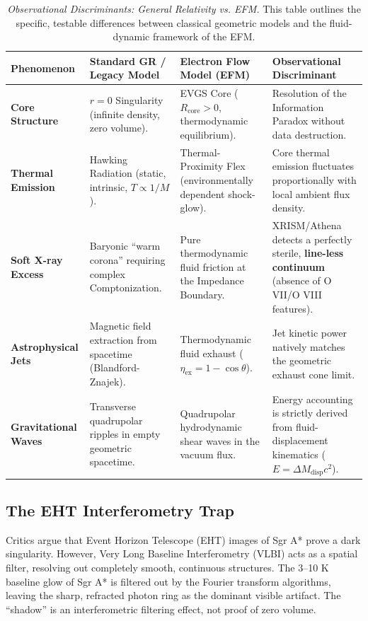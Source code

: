 \documentclass[11pt, a4paper]{article}
\begin{document}
\clearpage
\begin{table}[!ht]
  \centering
  \renewcommand{\arraystretch}{1.3}
  \begin{tabular}{@{} p{} p{} p{} p{} @{}}
    \toprule
    \textbf{Phenomenon} & \textbf{Standard GR / Legacy Model} & \textbf{Electron Flow Model (EFM)} & \textbf{Observational Discriminant} \\
    \midrule
    \textbf{Core Structure} & $r=0$ Singularity (infinite density, zero volume). & EVGS Core ($R_{\text{core}} > 0$, thermodynamic equilibrium). & Resolution of the Information Paradox without data destruction. \\
    \textbf{Thermal Emission} & Hawking Radiation (static, intrinsic, $T \propto 1/M$). & Thermal-Proximity Flex (environmentally dependent shock-glow). & Core thermal emission fluctuates proportionally with local ambient flux density. \\
    \textbf{Soft X-ray Excess} & Baryonic ``warm corona'' requiring complex Comptonization. & Pure thermodynamic fluid friction at the Impedance Boundary. & XRISM/Athena detects a perfectly sterile, \textbf{line-less continuum} (absence of O VII/O VIII features). \\
    \textbf{Astrophysical Jets} & Magnetic field extraction from spacetime (Blandford-Znajek). & Thermodynamic fluid exhaust ($\eta_{\text{ex}} = 1 - \cos\theta$). & Jet kinetic power natively matches the geometric exhaust cone limit. \\
    \textbf{Gravitational Waves} & Transverse quadrupolar ripples in empty geometric spacetime. & Quadrupolar hydrodynamic shear waves in the vacuum flux. & Energy accounting is strictly derived from fluid-displacement kinematics ($E = \Delta M_{\text{disp}} c^2$). \\
    \bottomrule
  \end{tabular}
  \caption{\textit{Observational Discriminants: General Relativity vs. EFM.} This table outlines the specific, testable differences between classical geometric models and the fluid-dynamic framework of the EFM.}
  \label{tab:predictions}
\end{table}

\subsection{The EHT Interferometry Trap}
Critics argue that Event Horizon Telescope (EHT) images of Sgr A* \cite{eht2019} prove a dark singularity. However, Very Long Baseline Interferometry (VLBI) acts as a spatial filter, resolving out completely smooth, continuous structures. The 3--10 K baseline glow of Sgr A* is filtered out by the Fourier transform algorithms, leaving the sharp, refracted photon ring as the dominant visible artifact. The ``shadow'' is an interferometric filtering effect, not proof of zero volume.
\end{document}
